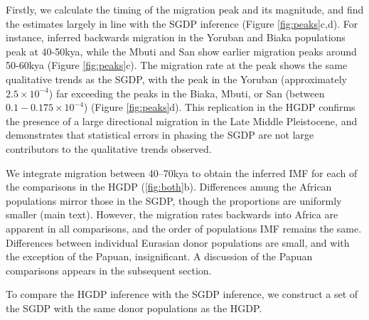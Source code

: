 Firstly, we calculate the timing of the migration peak and its magnitude, and find the estimates largely in line with the SGDP inference (Figure \ref{fig:peaks}c,d). For instance, inferred backwards migration in the Yoruban and Biaka populations peak at 40-50kya, while the Mbuti and San show earlier migration peaks around 50-60kya (Figure \ref{fig:peaks}c). The migration rate at the peak shows the same qualitative trends as the SGDP, with the peak in the Yoruban (approximately $2.5\times10^{-4}$) far exceeding the peaks in the Biaka, Mbuti, or San (between $0.1-0.175\times10^{-4}$) (Figure \ref{fig:peaks}d). This replication in the HGDP confirms the presence of a large directional migration in the Late Middle Pleistocene, and demonstrates that statistical errors in phasing the SGDP are not large contributors to the qualitative trends observed. 

We integrate migration between 40--70kya to obtain the inferred IMF for each of the comparisons in the HGDP (\ref{fig:both}b). Differences amung the African populations mirror those in the SGDP, though the proportions are uniformly smaller (main text). However, the migration rates backwards into Africa are apparent in all comparisons, and the order of populations IMF remains the same. Differences between individual Eurasian donor populations are small, and with the exception of the Papuan, insignificant. A discussion of the Papuan comparisons appears in the subsequent section.  

To compare the HGDP inference with the SGDP inference, we construct a set of the SGDP with the same donor populations as the HGDP.






